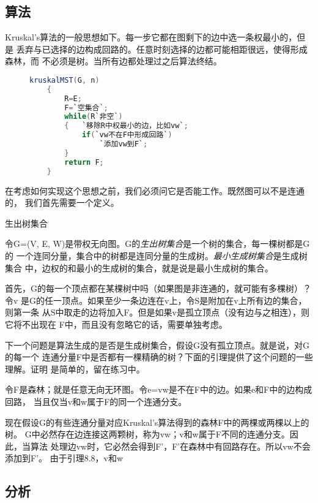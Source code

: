 \subsection{算法}
Kruskal's算法的一般思想如下。每一步它都在图剩下的边中选一条权最小的，但是
丢弃与已选择的边构成回路的。任意时刻选择的边都可能相距很远，使得形成森林，而
不必须是树。当所有边都处理过之后算法终结。
\begin{figure}
\begin{lstlisting}[language={Java},keywordstyle=\color{blue!70}, commentstyle=\color{red!50!green!50!blue!50}]
    kruskalMST(G, n)
    {
        R=E;
        F=`空集合`;
        while(R`非空`)
        {   `移除R中权最小的边，比如vw`;
            if(`vw不在F中形成回路`)
                `添加vw到F`;
        }
        return F;
    }
\end{lstlisting}
\end{figure}
在考虑如何实现这个思想之前，我们必须问它是否能工作。既然图可以不是连通的，
我们首先需要一个定义。

\begin{definition}
生出树集合

令G=(V, E, W)是带权无向图。G的\emph{生出树集合}是一个树的集合，每一棵树都是G的
一个连同分量，集合中的树都是连同分量的生成树。\emph{最小生成树集合}是生成树集合
中，边权的和最小的生成树的集合，就是说是最小生成树的集合。
\end{definition}

首先，G的每一个顶点都在某棵树中吗（如果图是非连通的，就可能有多棵树）？令v
是G的任一顶点。如果至少一条边连在v上，令S是附加在v上所有边的集合，则第一条
从S中取走的边将加入F。但是如果v是孤立顶点（没有边与之相连），则它将不出现在
F中，而且没有忽略它的话，需要单独考虑。

下一个问题是算法生成的是否是生成树集合，假设G没有孤立顶点。就是说，对G的每一个
连通分量F中是否都有一棵精确的树？下面的引理提供了这个问题的一些理解。证明
是简单的，留在练习中。

\begin{lemma}
令F是森林；就是任意无向无环图。令e=vw是不在F中的边。如果e和F中的边构成回路，
当且仅当v和w属于F的同一个连通分支。
\end{lemma}

现在假设G的有些连通分量对应Kruskal's算法得到的森林F中的两棵或两棵以上的树。
G中必然存在边连接这两颗树，称为vw；v和w属于F不同的连通分支。因此，当算法
处理边vw时，它必然会得到F'，F'在森林中有回路存在。所以vw不会添加到F'。
由于引理8.8，v和w

\subsection{分析}
